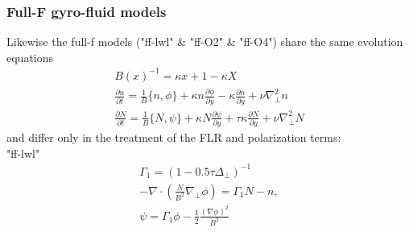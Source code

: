 \subsubsection{Full-F gyro-fluid models}
Likewise the full-f models ("ff-lwl" \& "ff-O2" \& "ff-O4") share the same evolution equations
\begin{subequations}
\begin{align}
B(x)^{-1} = \kappa x +1-\kappa X \\ 
 \frac{\partial n}{\partial t}     = 
    \frac{1}{B}\{ n, \phi\} 
  + \kappa n\frac{\partial \phi}{\partial y} 
  -\kappa \frac{\partial n}{\partial y}
  + \nu \nabla_\perp^2 n  \\
  \frac{\partial N}{\partial t} =
  \frac{1}{B}\{ N, \psi\} 
  + \kappa N\frac{\partial \psi}{\partial y} 
  + \tau \kappa\frac{\partial N}{\partial y} +\nu\nabla_\perp^2N
\end{align}
\end{subequations}
and differ only in the treatment of the FLR and polarization terms:\\
"ff-lwl" 
\begin{subequations}
\begin{align}
\Gamma_1 = ( 1- 0.5\tau\Delta_{\perp})^{-1}\\
 -\nabla\cdot \left(\frac{N}{B^2} \nabla_\perp \phi\right) = \Gamma_1 N-n, \\
\psi = \Gamma_1 \phi - \frac{1}{2} \frac{(\nabla\phi)^2}{B^2}\\
\end{align}
\end{subequations}


